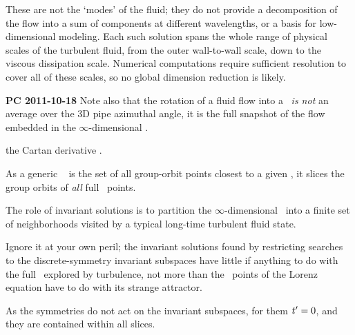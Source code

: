 These are not the `modes' of the fluid; {they
do not provide a decomposition of the flow into a sum of components at
different wavelengths, or a basis for low-dimensional
modeling.} Each such solution spans the whole range of physical scales of
the turbulent fluid, from the outer wall-to-wall scale, down to the
viscous dissipation scale. Numerical computations require sufficient
resolution to cover all of these scales, so no {global} dimension
reduction is likely.

        {\bf PC 2011-10-18} Note also that the rotation of a fluid flow
        into a \slice\ {\em is not} an average over the 3D pipe azimuthal
        angle, it is the full snapshot of the flow embedded in the
        $\infty$-dimensional \statesp.

the Cartan derivative .

As a generic \slice\  is the set of all group-orbit
points closest to a given {\template}, it slices the group orbits of
\emph{all} full \statesp\ points.

The role of invariant solutions is
to partition the $\infty$-dimensional \statesp\ into a finite set of
neighborhoods visited by a typical long-time turbulent fluid state.

Ignore it at
your own peril; the invariant solutions found by restricting
searches to the discrete-symmetry invariant subspaces have little if
anything to do with the full \statesp\ explored by turbulence, not more
than the \eqv\ points of the Lorenz equation have to do with its strange
attractor.

 As the symmetries do not act on
the invariant subspaces, for them $t'_{} = 0$, and they are
contained within all slices.
